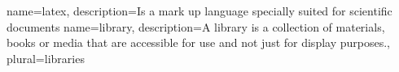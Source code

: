 \makeglossaries

{
        name=latex,
        description={Is a mark up language specially suited for
scientific documents}
}
{
        name=library,
        description={A library is a collection of materials, books or media that are accessible for use and not just for display purposes.},
        plural={libraries}
}
\glsaddall
